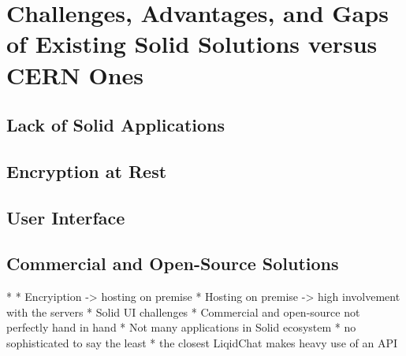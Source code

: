 \section{Challenges, Advantages, and Gaps of Existing Solid Solutions versus CERN Ones}

\subsection{Lack of Solid Applications}

\subsection{Encryption at Rest}

\subsection{User Interface}

\subsection{Commercial and Open-Source Solutions}



* 
* Encryiption -> hosting on premise
* Hosting on premise -> high involvement with the servers
* Solid UI challenges
* Commercial and open-source not perfectly hand in hand
* Not many applications in Solid ecosystem
    * no sophisticated to say the least
    * the closest LiqidChat makes heavy use of an API